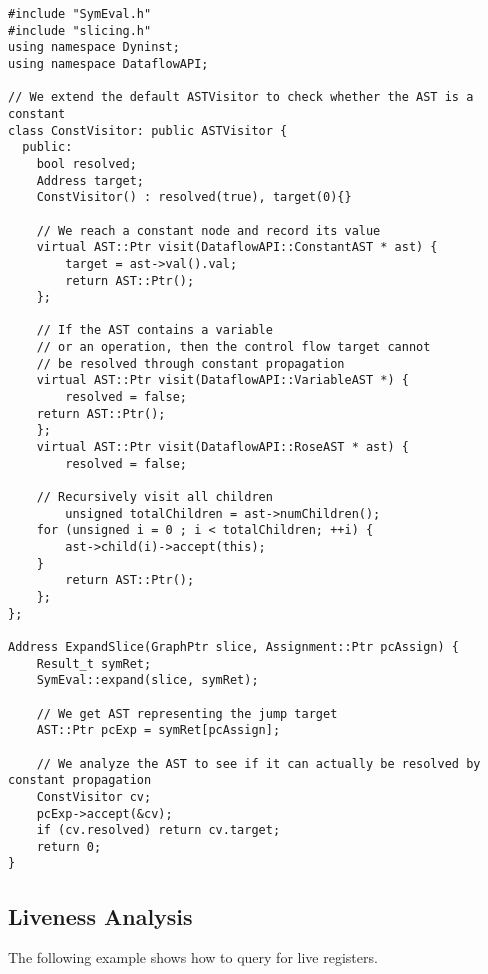 \lstset{numbers=left, numberstyle=\tiny, stepnumber=5, numbersep=5pt}
\lstset{showstringspaces=false}
\begin{lstlisting}
#include "SymEval.h"
#include "slicing.h"
using namespace Dyninst;
using namespace DataflowAPI;

// We extend the default ASTVisitor to check whether the AST is a constant
class ConstVisitor: public ASTVisitor {
  public:
    bool resolved;
    Address target;
    ConstVisitor() : resolved(true), target(0){}

    // We reach a constant node and record its value
    virtual AST::Ptr visit(DataflowAPI::ConstantAST * ast) {
        target = ast->val().val;
        return AST::Ptr();
    };

    // If the AST contains a variable 
    // or an operation, then the control flow target cannot
    // be resolved through constant propagation
    virtual AST::Ptr visit(DataflowAPI::VariableAST *) {
        resolved = false;
	return AST::Ptr();
    };
    virtual AST::Ptr visit(DataflowAPI::RoseAST * ast) {
        resolved = false;

	// Recursively visit all children
        unsigned totalChildren = ast->numChildren();
	for (unsigned i = 0 ; i < totalChildren; ++i) {
	    ast->child(i)->accept(this);
	}
        return AST::Ptr();
    };
};

Address ExpandSlice(GraphPtr slice, Assignment::Ptr pcAssign) {
    Result_t symRet;
    SymEval::expand(slice, symRet);

    // We get AST representing the jump target
    AST::Ptr pcExp = symRet[pcAssign];

    // We analyze the AST to see if it can actually be resolved by constant propagation
    ConstVisitor cv;
    pcExp->accept(&cv);
    if (cv.resolved) return cv.target;
    return 0;
}
\end{lstlisting}

\subsection{Liveness Analysis}
The following example shows how to query for live registers.

